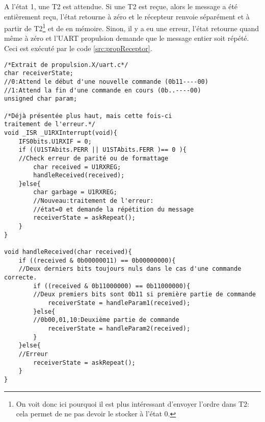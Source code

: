 A l'état 1, une T2 est attendue. Si une T2 est reçue, alors le message a été entièrement reçu, l'état retourne à zéro et le récepteur renvoie séparément  et  à partir de T2\footnote{On voit donc ici pourquoi il est plus intéressant d'envoyer l'ordre dans T2: cela permet de ne pas devoir le stocker à l'état 0.} et de  en mémoire. Sinon, il y a eu une erreur, l'état retourne quand même à zéro et l'UART propulsion demande que le message entier soit répété. Ceci est exécuté par le code \ref{src:propReceptor}.
\begin{listing}[htbp]
\begin{verbatim}
/*Extrait de propulsion.X/uart.c*/
char receiverState;
//0:Attend le début d'une nouvelle commande (0b11----00)
//1:Attend la fin d'une commande en cours (0b..----00)
unsigned char param;

/*Déjà présentée plus haut, mais cette fois-ci
traitement de l'erreur.*/
void _ISR _U1RXInterrupt(void){
    IFS0bits.U1RXIF = 0;
    if ((U1STAbits.PERR || U1STAbits.FERR )== 0 ){
    //Check erreur de parité ou de formattage
        char received = U1RXREG;
        handleReceived(received);
    }else{
        char garbage = U1RXREG;
        //Nouveau:traitement de l'erreur:
        //état=0 et demande la répétition du message
        receiverState = askRepeat();
    }
}

void handleReceived(char received){
    if ((received & 0b00000011) == 0b00000000){
    //Deux derniers bits toujours nuls dans le cas d'une commande correcte.
        if ((received & 0b11000000) == 0b11000000){
        //Deux premiers bits sont 0b11 si première partie de commande
            receiverState = handleParam1(received);
        }else{
        //0b00,01,10:Deuxième partie de commande
            receiverState = handleParam2(received);
        }
    }else{
    //Erreur
        receiverState = askRepeat();
    }
}
\end{verbatim}
\end{listing}
\clearpage
